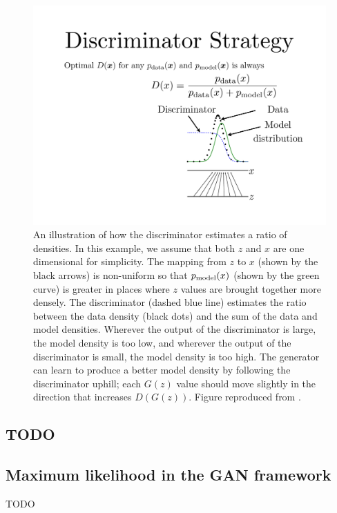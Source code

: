 \begin{figure}
\centering
\includegraphics[width=\figwidth]{ratio}
\caption{
An illustration of how the discriminator estimates a ratio of
densities.
In this example, we assume that both $z$ and $x$ are one dimensional
for simplicity.
The mapping from $z$ to $x$ (shown by the black arrows) is non-uniform so that $p_{\rm{model}}(x)$
(shown by the green curve) is
greater in places where $z$ values are brought together more densely.
The discriminator (dashed blue line) estimates the ratio between the data density (black dots)
and the sum of the data and model densities.
Wherever the output of the discriminator is large, the model density is too low, and wherever
the output of the discriminator is small, the model density is too high.
The generator can learn to produce a better model density by following the discriminator uphill;
each $G(z)$ value should move slightly in the direction that increases $D(G(z))$.
Figure reproduced from \citet{Goodfellow-et-al-NIPS2014-small}.
}
\label{fig:ratio}
\end{figure}


\subsection{TODO}

\subsection{Maximum likelihood in the GAN framework}
\label{sec:mle_soln}
TODO
